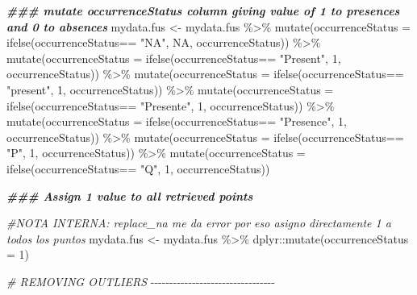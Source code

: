 \documentclass[
]{book}
\newenvironment{Shaded}{\begin{snugshade}}{\end{snugshade}}
\newcommand{\AttributeTok}[1]{\textcolor[rgb]{0.77,0.63,0.00}{#1}}
\newcommand{\CommentTok}[1]{\textcolor[rgb]{0.56,0.35,0.01}{\textit{#1}}}
\newcommand{\ConstantTok}[1]{\textcolor[rgb]{0.00,0.00,0.00}{#1}}
\newcommand{\DecValTok}[1]{\textcolor[rgb]{0.00,0.00,0.81}{#1}}
\newcommand{\DocumentationTok}[1]{\textcolor[rgb]{0.56,0.35,0.01}{\textbf{\textit{#1}}}}
\newcommand{\FunctionTok}[1]{\textcolor[rgb]{0.00,0.00,0.00}{#1}}
\newcommand{\NormalTok}[1]{#1}
\newcommand{\OtherTok}[1]{\textcolor[rgb]{0.56,0.35,0.01}{#1}}
\newcommand{\SpecialCharTok}[1]{\textcolor[rgb]{0.00,0.00,0.00}{#1}}
\newcommand{\StringTok}[1]{\textcolor[rgb]{0.31,0.60,0.02}{#1}}
\begin{document}
\begin{Shaded}
\begin{Highlighting}[]
  \DocumentationTok{\#\#\# mutate occurrenceStatus column giving value of 1 to presences and 0 to absences}
\NormalTok{  mydata.fus }\OtherTok{\textless{}{-}}\NormalTok{ mydata.fus }\SpecialCharTok{\%\textgreater{}\%} 
    \FunctionTok{mutate}\NormalTok{(}\AttributeTok{occurrenceStatus =} \FunctionTok{ifelse}\NormalTok{(occurrenceStatus}\SpecialCharTok{==} \StringTok{"NA"}\NormalTok{, }\ConstantTok{NA}\NormalTok{, occurrenceStatus)) }\SpecialCharTok{\%\textgreater{}\%}
    \FunctionTok{mutate}\NormalTok{(}\AttributeTok{occurrenceStatus =} \FunctionTok{ifelse}\NormalTok{(occurrenceStatus}\SpecialCharTok{==} \StringTok{"Present"}\NormalTok{, }\DecValTok{1}\NormalTok{, occurrenceStatus)) }\SpecialCharTok{\%\textgreater{}\%} 
    \FunctionTok{mutate}\NormalTok{(}\AttributeTok{occurrenceStatus =} \FunctionTok{ifelse}\NormalTok{(occurrenceStatus}\SpecialCharTok{==} \StringTok{"present"}\NormalTok{, }\DecValTok{1}\NormalTok{, occurrenceStatus)) }\SpecialCharTok{\%\textgreater{}\%} 
    \FunctionTok{mutate}\NormalTok{(}\AttributeTok{occurrenceStatus =} \FunctionTok{ifelse}\NormalTok{(occurrenceStatus}\SpecialCharTok{==} \StringTok{"Presente"}\NormalTok{, }\DecValTok{1}\NormalTok{, occurrenceStatus)) }\SpecialCharTok{\%\textgreater{}\%} 
    \FunctionTok{mutate}\NormalTok{(}\AttributeTok{occurrenceStatus =} \FunctionTok{ifelse}\NormalTok{(occurrenceStatus}\SpecialCharTok{==} \StringTok{"Presence"}\NormalTok{, }\DecValTok{1}\NormalTok{, occurrenceStatus)) }\SpecialCharTok{\%\textgreater{}\%} 
    \FunctionTok{mutate}\NormalTok{(}\AttributeTok{occurrenceStatus =} \FunctionTok{ifelse}\NormalTok{(occurrenceStatus}\SpecialCharTok{==} \StringTok{"P"}\NormalTok{, }\DecValTok{1}\NormalTok{, occurrenceStatus)) }\SpecialCharTok{\%\textgreater{}\%} 
    \FunctionTok{mutate}\NormalTok{(}\AttributeTok{occurrenceStatus =} \FunctionTok{ifelse}\NormalTok{(occurrenceStatus}\SpecialCharTok{==} \StringTok{"Q"}\NormalTok{, }\DecValTok{1}\NormalTok{, occurrenceStatus))}

  \DocumentationTok{\#\#\# Assign 1 value to all retrieved points }
  
  \CommentTok{\#NOTA INTERNA: replace\_na me da error por eso asigno directamente 1 a todos los puntos}
\NormalTok{  mydata.fus }\OtherTok{\textless{}{-}}\NormalTok{ mydata.fus  }\SpecialCharTok{\%\textgreater{}\%} 
\NormalTok{    dplyr}\SpecialCharTok{::}\FunctionTok{mutate}\NormalTok{(}\AttributeTok{occurrenceStatus =} \DecValTok{1}\NormalTok{)}

\CommentTok{\# REMOVING OUTLIERS}
\SpecialCharTok{{-}{-}{-}{-}{-}{-}{-}{-}{-}{-}{-}{-}{-}{-}{-}{-}{-}{-}{-}{-}{-}{-}{-}{-}{-}{-}{-}{-}{-}{-}{-}{-}{-}}  


\end{Highlighting}
\end{Shaded}
\end{document}
